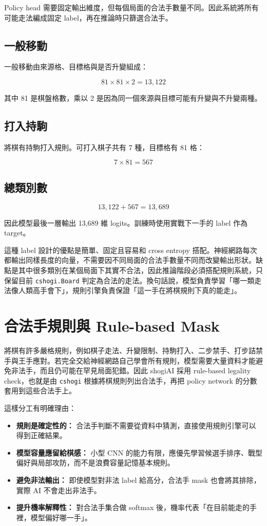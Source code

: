 \documentclass[12pt,a4paper,fontset=none]{ctexart}
\begin{document}
Policy head 需要固定輸出維度，但每個局面的合法手數量不同。因此系統將所有可能走法編成固定 label，再在推論時只篩選合法手。

\subsection{一般移動}

一般移動由來源格、目標格與是否升變組成：

\[
81 \times 81 \times 2 = 13,122
\]

其中 81 是棋盤格數，乘以 2 是因為同一個來源與目標可能有升變與不升變兩種。

\subsection{打入持駒}

將棋有持駒打入規則。可打入棋子共有 7 種，目標格有 81 格：

\[
7 \times 81 = 567
\]

\subsection{總類別數}

\[
13,122 + 567 = 13,689
\]

因此模型最後一層輸出 13,689 維 logits。訓練時使用實戰下一手的 label 作為 target。

這種 label 設計的優點是簡單、固定且容易和 cross entropy 搭配。神經網路每次都輸出同樣長度的向量，不需要因不同局面的合法手數量不同而改變輸出形狀。缺點是其中很多類別在某個局面下其實不合法，因此推論階段必須搭配規則系統，只保留目前 \texttt{cshogi.Board} 判定為合法的走法。換句話說，模型負責學習「哪一類走法像人類高手會下」，規則引擎負責保證「這一手在將棋規則下真的能走」。

\section{合法手規則與 Rule-based Mask}

將棋有許多嚴格規則，例如棋子走法、升變限制、持駒打入、二步禁手、打步詰禁手與王手應對。若完全交給神經網路自己學會所有規則，模型需要大量資料才能避免非法手，而且仍可能在罕見局面犯錯。因此 shogiAI 採用 rule-based legality check，也就是由 \texttt{cshogi} 根據將棋規則列出合法手，再把 policy network 的分數套用到這些合法手上。

這樣分工有明確理由：

\begin{itemize}
  \item \textbf{規則是確定性的：} 合法手判斷不需要從資料中猜測，直接使用規則引擎可以得到正確結果。
  \item \textbf{模型容量應留給棋感：} 小型 CNN 的能力有限，應優先學習候選手排序、戰型偏好與局部攻防，而不是浪費容量記憶基本規則。
  \item \textbf{避免非法輸出：} 即使模型對非法 label 給高分，合法手 mask 也會將其排除，實際 AI 不會走出非法手。
  \item \textbf{提升機率解釋性：} 對合法手集合做 softmax 後，機率代表「在目前能走的手裡，模型偏好哪一手」。
\end{itemize}
\end{document}
